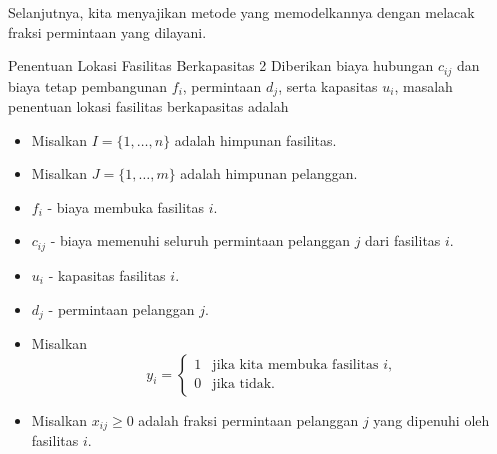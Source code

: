 \iffalse  %
Selanjutnya, kita menyajikan metode yang memodelkannya dengan melacak fraksi permintaan yang dilayani.
\begin{general}{Penentuan Lokasi Fasilitas Berkapasitas 2}{\npcomplete}
Diberikan biaya hubungan $c_{ij}$ dan biaya tetap pembangunan $f_i$, permintaan $d_j$, serta kapasitas $u_i$, masalah penentuan lokasi fasilitas berkapasitas adalah

\begin{itemize}
\item Misalkan $I = \{1,\dots, n\}$ adalah himpunan fasilitas.
\item Misalkan $J = \{1, \dots, m\}$ adalah himpunan pelanggan.
\end{itemize}

\begin{itemize}
\item $f_i$ - biaya membuka fasilitas $i$.
\item $c_{ij}$ - biaya memenuhi seluruh permintaan pelanggan $j$ dari fasilitas $i$.
\item $u_{i}$ - kapasitas fasilitas $i$.
\item $d_{j}$ - permintaan pelanggan $j$.
\end{itemize}

\begin{itemize}
\item Misalkan
\begin{equation*}
y_{i} = \begin{cases}
1 & \text{jika kita membuka fasilitas $i$,}\\
0 & \text{jika tidak.}
\end{cases}
\end{equation*}
\item Misalkan $x_{ij} \geq 0$ adalah fraksi permintaan pelanggan $j$ yang dipenuhi oleh fasilitas $i$.
\end{itemize}


\end{general}

